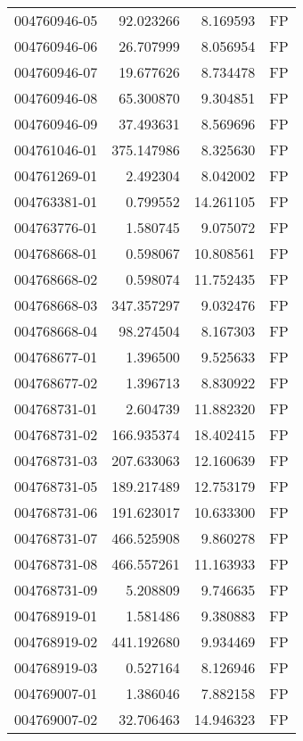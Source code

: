 \begin{tabular}{lrrl}
004760946-05 &   92.023266 &       8.169593 &   FP \\
004760946-06 &   26.707999 &       8.056954 &   FP \\
004760946-07 &   19.677626 &       8.734478 &   FP \\
004760946-08 &   65.300870 &       9.304851 &   FP \\
004760946-09 &   37.493631 &       8.569696 &   FP \\
004761046-01 &  375.147986 &       8.325630 &   FP \\
004761269-01 &    2.492304 &       8.042002 &   FP \\
004763381-01 &    0.799552 &      14.261105 &   FP \\
004763776-01 &    1.580745 &       9.075072 &   FP \\
004768668-01 &    0.598067 &      10.808561 &   FP \\
004768668-02 &    0.598074 &      11.752435 &   FP \\
004768668-03 &  347.357297 &       9.032476 &   FP \\
004768668-04 &   98.274504 &       8.167303 &   FP \\
004768677-01 &    1.396500 &       9.525633 &   FP \\
004768677-02 &    1.396713 &       8.830922 &   FP \\
004768731-01 &    2.604739 &      11.882320 &   FP \\
004768731-02 &  166.935374 &      18.402415 &   FP \\
004768731-03 &  207.633063 &      12.160639 &   FP \\
004768731-05 &  189.217489 &      12.753179 &   FP \\
004768731-06 &  191.623017 &      10.633300 &   FP \\
004768731-07 &  466.525908 &       9.860278 &   FP \\
004768731-08 &  466.557261 &      11.163933 &   FP \\
004768731-09 &    5.208809 &       9.746635 &   FP \\
004768919-01 &    1.581486 &       9.380883 &   FP \\
004768919-02 &  441.192680 &       9.934469 &   FP \\
004768919-03 &    0.527164 &       8.126946 &   FP \\
004769007-01 &    1.386046 &       7.882158 &   FP \\
004769007-02 &   32.706463 &      14.946323 &   FP \\

\end{tabular}
